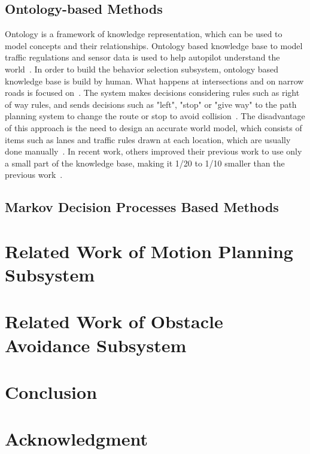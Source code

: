 \documentclass[conference]{IEEEtran}
\begin{document}
\subsection{Ontology-based Methods}
Ontology is a framework of knowledge representation, which can be used to model concepts and their relationships. Ontology based knowledge base to model traffic regulations and sensor data is used to help autopilot understand the world~\cite{Zhao2015ontology}. In order to build the behavior selection subsystem, ontology based knowledge base is build by human. What happens at intersections and on narrow roads is focused on~\cite{Zhao2015ontology}. The system makes decisions considering rules such as right of way rules, and sends decisions such as "left", "stop" or "give way" to the path planning system to change the route or stop to avoid collision~\cite{Zhao2015ontology}. The disadvantage of this approach is the need to design an accurate world model, which consists of items such as lanes and traffic rules drawn at each location, which are usually done manually~\cite{Zhao2015ontology}. In recent work, others improved their previous work to use only a small part of the knowledge base, making it 1/20 to 1/10 smaller than the previous work~\cite{Zhao20171425}.

\subsection{Markov Decision Processes Based Methods}

\section{Related Work of Motion Planning Subsystem}\label{sec:motion_planner}


\section{Related Work of Obstacle Avoidance Subsystem}\label{sec:obstacle_avoider}

\section{Conclusion}


\section*{Acknowledgment}


%
% 
\end{document}
